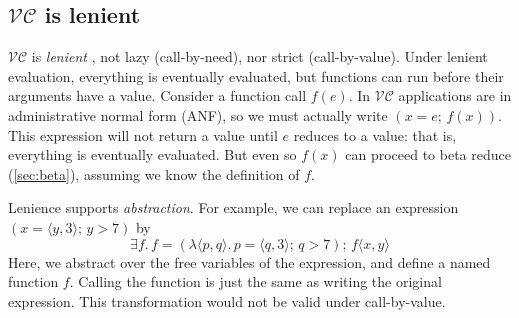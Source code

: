 \documentclass[acmsmall,review,dvipsnames]{acmart}
\newcommand{\Varid}[1]{\mathit{#1}}
\newcommand{\versecalc}{$\mathcal{VC}$}
\newcommand{\rulename}[1]{\textsc{\small #1}}
\newcommand{\movesto}{\longrightarrow}
\begin{document}

\subsection{\versecalc{} is lenient} \label{sec:lenient}

\versecalc{} is \emph{lenient} \cite{lenience},
not lazy (call-by-need), nor strict (call-by-value).
Under lenient
evaluation, everything is eventually evaluated, but functions can run
before their arguments have a value.
Consider a function
call \ensuremath{\Varid{f}(\Varid{e})}.  In \versecalc{} applications are in administrative normal form (ANF),
so we must actually write \ensuremath{(\Varid{x}\mathrel{=}\Varid{e};\,\Varid{f}(\Varid{x}))}. This expression will not return a value until
\ensuremath{\Varid{e}} reduces to a value: that is, everything is eventually evaluated.  But even so \ensuremath{\Varid{f}(\Varid{x})} can proceed
to beta reduce (\cref{sec:beta}), assuming we know the definition of \ensuremath{\Varid{f}}.

Lenience supports \emph{abstraction}.  For example, we can replace an expression \ensuremath{(\Varid{x}\mathrel{=}\langle{}\Varid{y},\mathrm{3}\rangle;\,\Varid{y}\mathbin{>}\mathrm{7})} by
$$
\ensuremath{\exists\Varid{f}.\,\Varid{f}\mathrel{=}(\lambda\langle{}\Varid{p},\Varid{q}\rangle.\,\Varid{p}\mathrel{=}\langle{}\Varid{q},\mathrm{3}\rangle;\,\Varid{q}\mathbin{>}\mathrm{7});\,\Varid{f}\langle\Varid{x},\Varid{y}\rangle}
$$
Here, we abstract over the free variables of the expression, and define a named function \ensuremath{\Varid{f}}.
Calling the function is just the same as writing the original expression.
This transformation would not be valid under call-by-value.
\end{document}
